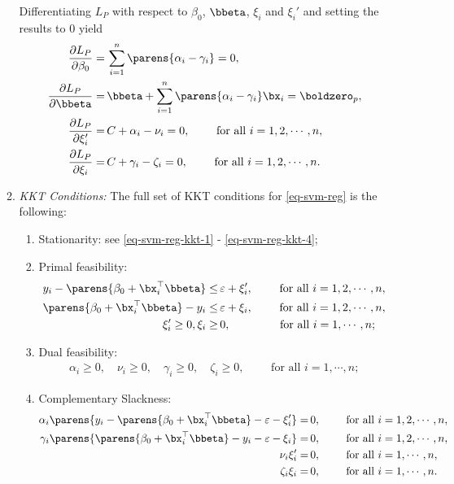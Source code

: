 \documentclass[12pt]{article}
\begin{document}
\begin{enumerate}[label=\textbf{\arabic*.}]
\begin{enumerate}
		Differentiating $L_P$ with respect to $\beta_0$, $\bbeta$, $\xi_i$ and $\xi_i'$ and setting the results to 0 yield 
		\begin{align}
			\frac{\partial L_P}{\partial \beta_0} = & \, \sum_{i=1}^n \parens{\alpha_i - \gamma_i} = 0, \label{eq-svm-reg-kkt-1} \\ 
			\frac{\partial L_P}{\partial \bbeta} = & \, \bbeta + \sum_{i=1}^n \parens{\alpha_i - \gamma_i} \bx_i = \boldzero_p, \\ 
			\frac{\partial L_P}{\partial \xi_i'} = & \, C + \alpha_i - \nu_i = 0, \qquad \text{ for all } i = 1, 2, \cdots, n, \\
			\frac{\partial L_P}{\partial \xi_i} = & \, C + \gamma_i - \zeta_i = 0, \qquad \text{ for all } i = 1, 2, \cdots, n. \label{eq-svm-reg-kkt-4}
		\end{align}
		
		\item \textit{KKT Conditions:} The full set of KKT conditions for \eqref{eq-svm-reg} is the following: 
		\begin{enumerate}
			\item Stationarity: see \eqref{eq-svm-reg-kkt-1}	 - \eqref{eq-svm-reg-kkt-4}; 
			
			\item Primal feasibility: 
			\begin{align*}
				y_i - \parens{\beta_0 + \bx_i^\top \bbeta} \le & \, \varepsilon + \xi_i', \qquad \text{ for all } i = 1, 2, \cdots, n, \\ 
				\parens{\beta_0 + \bx_i^\top \bbeta} - y_i \le & \,  \varepsilon + \xi_i, \qquad \text{ for all } i = 1, 2, \cdots, n, \\ 
				\xi_i' \ge 0, \xi_i \ge & \, 0, \qquad \qquad \text{ for all } i = 1, \cdots, n; 
			\end{align*}
			
			\item Dual feasibility: 
			\begin{align*}
				\alpha_i \ge 0, \quad \nu_i \ge 0, \quad \gamma_i \ge 0, \quad \zeta_i \ge 0, \qquad \text{ for all } i = 1, \cdots, n; 
			\end{align*}
			
			\item Complementary Slackness: 
			\begin{align*}
				\alpha_i \parens{y_i - \parens{\beta_0 + \bx_i^\top \bbeta} - \varepsilon - \xi_i'} = & \, 0, \qquad \text{ for all } i = 1, 2, \cdots, n, \\ 
				\gamma_i \parens{\parens{\beta_0 + \bx_i^\top \bbeta} - y_i - \varepsilon - \xi_i} = & \, 0, \qquad \text{ for all } i = 1, 2, \cdots, n, \\ 
				\nu_i \xi_i' = & \, 0, \qquad \text{ for all } i = 1, \cdots, n, \\ 
				\zeta_i \xi_i = & \, 0, \qquad \text{ for all } i = 1, \cdots, n. 
			\end{align*}
		

\end{enumerate}
\end{enumerate}
\end{enumerate}
\end{document}
